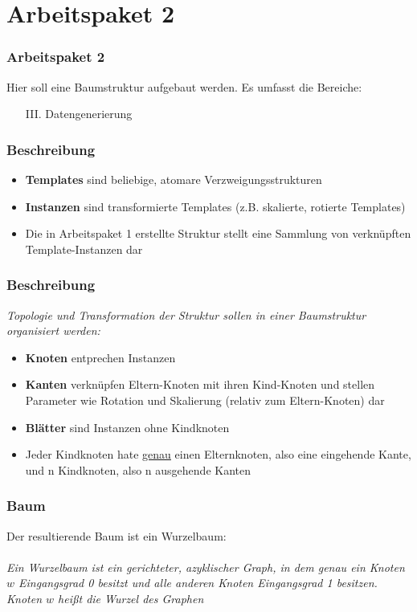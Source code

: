 \documentclass[12pt]{beamer}
\begin{document}
    \section{Arbeitspaket 2}
    \label{sec:2}

    \begin{frame}
        \frametitle{Arbeitspaket 2}
        Hier soll eine Baumstruktur aufgebaut werden.
        Es umfasst die Bereiche:
        \begin{itemize}
            \item[III.] Datengenerierung
        \end{itemize}
    \end{frame}

    \begin{frame}
        \frametitle{Beschreibung}
        \begin{itemize}
            \item \textbf{Templates} sind beliebige, atomare Verzweigungsstrukturen
            \item \textbf{Instanzen} sind transformierte Templates (z.B. skalierte, rotierte Templates)
            \item Die in Arbeitspaket 1 erstellte Struktur stellt eine Sammlung von verknüpften Template-Instanzen dar
        \end{itemize}
    \end{frame}

    \begin{frame}
        \frametitle{Beschreibung}
        \textit{Topologie und Transformation der Struktur sollen in einer  Baumstruktur organisiert werden:}
        \begin{itemize}
            \item \textbf{Knoten} entprechen Instanzen
            \item \textbf{Kanten} verknüpfen Eltern-Knoten mit ihren Kind-Knoten und stellen Parameter wie Rotation
            und Skalierung (relativ zum Eltern-Knoten) dar
            \item \textbf{Blätter} sind Instanzen ohne Kindknoten
            \item Jeder Kindknoten hate \underline{genau} einen Elternknoten, also eine eingehende Kante, und n
            Kindknoten, also n ausgehende Kanten
        \end{itemize}
    \end{frame}

    \begin{frame}
        \frametitle{Baum}
        Der resultierende Baum ist ein Wurzelbaum:\\~\\
        \textit{Ein Wurzelbaum ist ein gerichteter, azyklischer Graph, in dem genau ein Knoten $w$ Eingangsgrad 0 besitzt und
        alle anderen Knoten Eingangsgrad 1 besitzen. Knoten $w$ heißt die Wurzel des Graphen}
    \end{frame}
\end{document}
